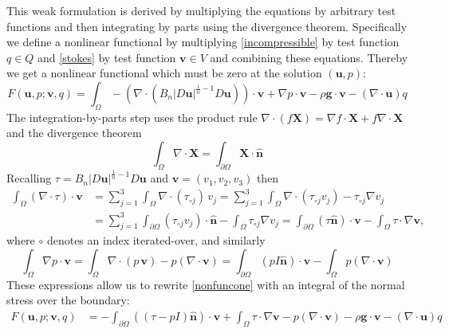\documentclass[letterpaper,final,12pt,reqno]{amsart}
\newcommand{\grad}{\nabla}
\newcommand{\hbn}{\hat{\mathbf{n}}}
\newcommand{\bu}{\mathbf{u}}
\newcommand{\bv}{\mathbf{v}}
\newcommand{\bX}{\mathbf{X}}
\begin{document}
This weak formulation is derived by multiplying the equations by arbitrary test functions and then integrating by parts using the divergence theorem.  Specifically we define a nonlinear functional by multiplying \eqref{incompressible} by test function $q\in Q$ and \eqref{stokes} by test function $\bv\in V$ and combining these equations.  Thereby we get a nonlinear functional which must be zero at the solution $(\bu,p)$:
\begin{equation}
F(\bu,p;\bv,q) = \int_\Omega - \left(\nabla \cdot \left(B_n |D\bu|^{\frac{1}{n} - 1} D\bu\right)\right)\cdot \bv + \nabla p \cdot \bv - \rho \mathbf{g} \cdot \bv - \left(\nabla \cdot \bu\right) q \label{nonfuncone}
\end{equation}
The integration-by-parts step uses the product rule $\nabla \cdot(f\bX) = \grad f\cdot \bX + f \nabla \cdot \bX$ and the divergence theorem
    $$\int_\Omega \nabla \cdot \bX = \int_{\partial \Omega} \bX \cdot \hbn$$
Recalling $\tau = B_n |D\bu|^{\frac{1}{n} - 1} D\bu$ and $\bv = (v_1,v_2,v_3)$ then
\begin{align*}
\int_\Omega \left(\nabla \cdot \tau\right)\cdot \bv &= \sum_{j=1}^3 \int_\Omega \nabla \cdot (\tau_{\circ j})\, v_j = \sum_{j=1}^3 \int_\Omega \nabla \cdot (\tau_{\circ j} v_j) - \tau_{\circ j} \nabla v_j \\
  &= \sum_{j=1}^3 \int_{\partial \Omega} (\tau_{\circ j} v_j) \cdot \hbn - \int_\Omega \tau_{\circ j} \nabla v_j = \int_{\partial \Omega} (\tau \hbn)\cdot \bv - \int_\Omega \tau \cdot \nabla \bv,
\end{align*}
where $\circ$ denotes an index iterated-over, and similarly
    $$\int_\Omega \nabla p \cdot \bv = \int_\Omega \nabla\cdot (p\,\bv) - p (\nabla \cdot \bv) = \int_{\partial \Omega} (p I\hbn)\cdot \bv - \int_\Omega p (\nabla \cdot \bv)$$
These expressions allow us to rewrite \eqref{nonfuncone} with an integral of the normal stress over the boundary:
\begin{align}
F(\bu,p;\bv,q) &= -\int_{\partial\Omega} ((\tau-pI) \hbn)\cdot \bv + \int_\Omega \tau \cdot \nabla \bv - p (\nabla \cdot \bv) - \rho \mathbf{g} \cdot \bv - \left(\nabla \cdot \bu\right) q \label{nonfunctwo}
\end{align}





\footnotesize

\bigskip
\end{document}
